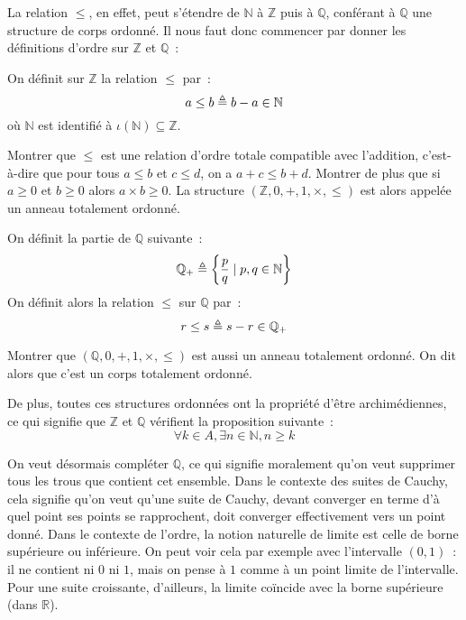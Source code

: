 La relation $\leq$, en effet, peut s'étendre de $\mathbb N$ à $\mathbb Z$ puis
à $\mathbb Q$, conférant à $\mathbb Q$ une structure de corps ordonné. Il nous
faut donc commencer par donner les définitions d'ordre sur $\mathbb Z$ et
$\mathbb Q$~:

\begin{definition}
  On définit sur $\mathbb Z$ la relation $\leq$ par~:
  \[a \leq b \triangleq b - a \in \mathbb N\]
  où $\mathbb N$ est identifié à $\iota(\mathbb N) \subseteq \mathbb Z$.
\end{definition}

\begin{exercise}
  Montrer que $\leq$ est une relation d'ordre totale compatible avec l'addition,
  c'est-à-dire que pour tous $a\leq b$ et $c\leq d$, on a $a+c\leq b+d$.
  Montrer de plus que si $a \geq 0$ et $b\geq 0$ alors $a\times b \geq 0$.
  La structure $(\mathbb Z,0,+,1,\times,\leq)$ est alors appelée un anneau
  totalement ordonné.
\end{exercise}

\begin{definition}
  On définit la partie de $\mathbb Q$ suivante~:
  \[\mathbb Q_+ \triangleq \left\{\frac{p}{q}\mid p,q\in \mathbb N\right\}\]
  On définit alors la relation $\leq$ sur $\mathbb Q$ par~:
  \[r \leq s \triangleq s - r \in \mathbb Q_+\]
\end{definition}

\begin{exercise}
  Montrer que $(\mathbb Q,0,+,1,\times,\leq)$ est aussi un anneau totalement
  ordonné. On dit alors que c'est un corps totalement ordonné.
\end{exercise}

De plus, toutes ces structures ordonnées ont la propriété d'être archimédiennes,
ce qui signifie que $\mathbb Z$ et $\mathbb Q$ vérifient la proposition
suivante~:
\[\forall k\in A, \exists n \in\mathbb N, n \geq k\]

On veut désormais compléter $\mathbb Q$, ce qui signifie moralement qu'on veut
supprimer tous les trous que contient cet ensemble. Dans le contexte des suites
de Cauchy, cela signifie qu'on veut qu'une suite de Cauchy, devant converger en
terme d'à quel point ses points se rapprochent, doit converger effectivement
vers un point donné. Dans le contexte de l'ordre, la notion naturelle de limite
est celle de borne supérieure ou inférieure. On peut voir cela par exemple avec
l'intervalle $(0,1)$~: il ne contient ni $0$ ni $1$, mais on pense à $1$ comme à
un point limite de l'intervalle. Pour une suite croissante, d'ailleurs, la
limite coïncide avec la borne supérieure (dans $\mathbb R$).

